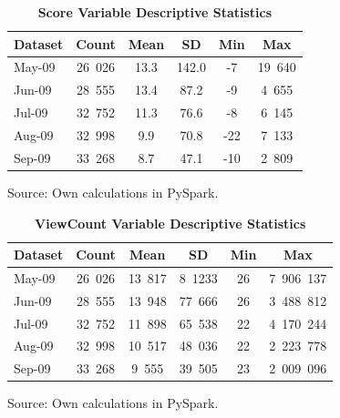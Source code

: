 \documentclass[11pt,preprint, authoryear]{article}
\begin{document}
\footnotesize

\begin{longtable} {@{} lccccc @{}}
\caption{\textbf{Score Variable Descriptive Statistics}}
\label{tab:score_desc}\\ 
\toprule
\textbf{Dataset} & \textbf{Count} & \textbf{Mean} & \textbf{SD} & \textbf{Min} & \textbf{Max} \\ 
\midrule
May-09 &  26\ 026 &  13.3 &   142.0 &   -7 &  19\ 640 \\
Jun-09 &  28\ 555 &  13.4 &    87.2 &   -9 &   4\ 655 \\
Jul-09 &  32\ 752 &  11.3 &    76.6 &   -8 &   6\ 145 \\
Aug-09 &  32\ 998 &   9.9 &    70.8 &  -22 &   7\ 133 \\
Sep-09 &  33\ 268 &   8.7 &    47.1 &  -10 &   2\ 809 \\
\bottomrule
\end{longtable}\begin{center} Source: Own calculations in PySpark.\end{center}

\normalsize

\footnotesize

\begin{longtable} {@{} lccccc @{}}
\caption{\textbf{ViewCount Variable Descriptive Statistics}}
\label{tab:viewc_desc}\\ 
\toprule
\textbf{Dataset} & \textbf{Count} & \textbf{Mean} & \textbf{SD} & \textbf{Min} & \textbf{Max} \\ 
\midrule
May-09 &  26\ 026 &  13\ 817 &  8\ 1233  &   26 &  7\ 906\ 137 \\
Jun-09 &  28\ 555 &  13\ 948  &  77\ 666  &   26 &  3\ 488\ 812 \\
Jul-09 &  32\ 752 &  11\ 898  &  65\ 538  &   22 &  4\ 170\ 244 \\
Aug-09 &  32\ 998 &  10\ 517  &  48\ 036  &   22 &  2\ 223\ 778 \\
Sep-09 &  33\ 268 &   9\ 555  &  39\ 505  &   23 &  2\ 009\ 096 \\
\bottomrule
\end{longtable}\begin{center} Source: Own calculations in PySpark.\end{center}

\normalsize

\footnotesize
\end{document}
